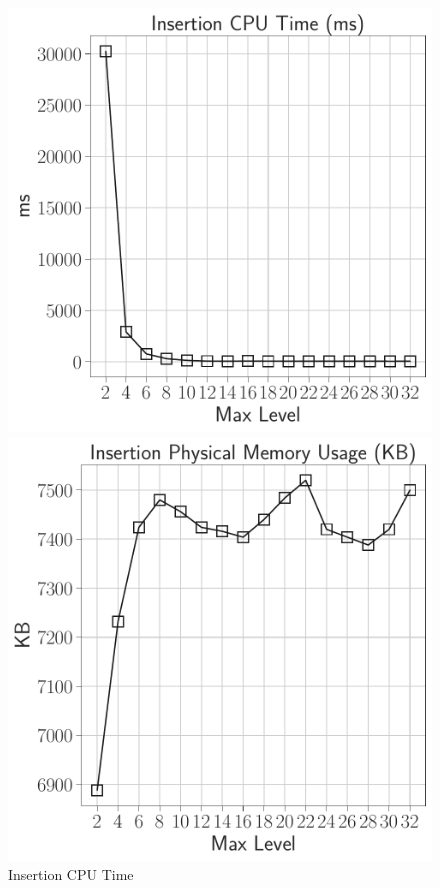 \documentclass{article}
\begin{document}
\begin{figure}[H]
    \centering
    \begin{minipage}{0.32\textwidth}
        \centering
        \includegraphics[width=\linewidth]{../notebook/plot/sl_maxlevel_insertion_cpu_time_(ms).pdf}
        \caption*{Insertion CPU Time}
    \end{minipage}\hfill
    \begin{minipage}{0.32\textwidth}
        \centering
        \includegraphics[width=\linewidth]{../notebook/plot/sl_maxlevel_insertion_physical_memory_usage_(kb).pdf}

\end{minipage}
\end{figure}
\end{document}
